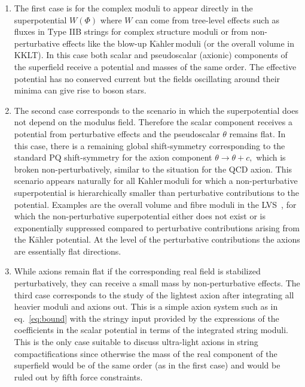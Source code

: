 \documentclass[11pt,a4paper]{article}
\newcommand{\Kahler}{\ensuremath{\text{K}\ddot{\text{a}}\text{hler}\,}}
\begin{document}
\begin{enumerate}
\item{}
The first case is for the complex moduli to appear directly in the superpotential $W(\Phi)$ where $W$ can come from tree-level effects such as fluxes in Type IIB strings for complex structure moduli or from non-perturbative effects like the blow-up \Kahler moduli (or the overall volume in KKLT).  In this case both scalar and pseudoscalar (axionic) components of the superfield receive a potential and masses of the same order. The effective potential has no conserved current but the fields oscillating around their minima can give rise to boson stars.

\item{}
The second case corresponds to the scenario in which the superpotential does not depend on the modulus field. Therefore the scalar component receives a potential from perturbative effects and the pseudoscalar $\theta$ remains flat. In this case, there is a remaining global shift-symmetry corresponding to the standard PQ shift-symmetry for the axion component $\theta\to \theta + c,$ which is broken non-perturbatively, similar to the situation for the QCD axion. 
This scenario appears naturally for all \Kahler moduli for which a non-perturbative superpotential is hierarchically smaller than perturbative contributions to the potential. Examples are the overall volume and fibre moduli in the LVS~\cite{Cicoli:2008va}, for which the non-perturbative superpotential either does not exist or is exponentially suppressed compared to perturbative contributions arising from the K\"ahler potential. At the level of the perturbative contributions the axions are essentially flat directions.

\item{}
While axions remain flat if the corresponding real field is stabilized perturbatively, they can receive a small mass by non-perturbative effects. The third case corresponds to the study of the lightest axion after integrating all heavier moduli and axions out. This is a simple axion system such as in eq.~\eqref{eq:bound} with the stringy input provided by the expressions of the coefficients in the scalar potential in terms of the integrated string moduli. This is the only case suitable to discuss ultra-light axions in string compactifications since otherwise the mass of the real component of the superfield would be of the same order (as in the first case) and would be ruled out by fifth force constraints.
\end{enumerate}
\end{document}
